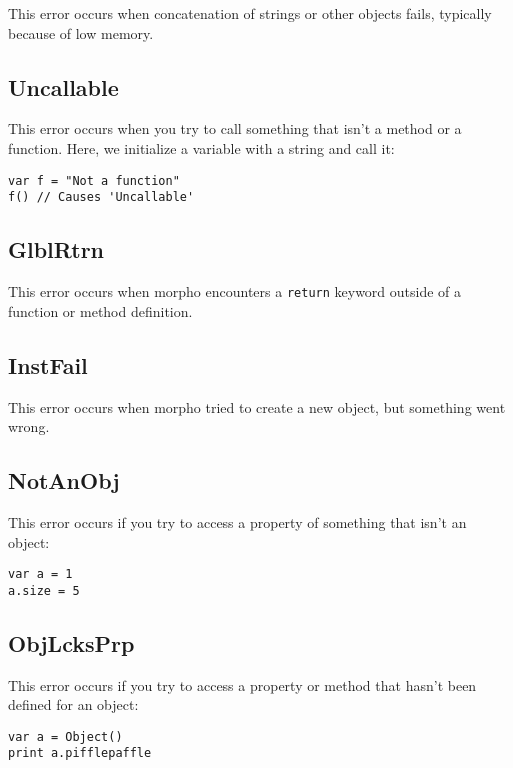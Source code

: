 This error occurs when concatenation of strings or other objects fails,
typically because of low memory.

\hypertarget{uncallable}{%
\subsection{Uncallable}\label{uncallable}}

This error occurs when you try to call something that isn't a method or
a function. Here, we initialize a variable with a string and call it:

\begin{lstlisting}
var f = "Not a function"
f() // Causes 'Uncallable'
\end{lstlisting}

\hypertarget{glblrtrn}{%
\subsection{GlblRtrn}\label{glblrtrn}}

This error occurs when morpho encounters a \texttt{return} keyword
outside of a function or method definition.

\hypertarget{instfail}{%
\subsection{InstFail}\label{instfail}}

This error occurs when morpho tried to create a new object, but
something went wrong.

\hypertarget{notanobj}{%
\subsection{NotAnObj}\label{notanobj}}

This error occurs if you try to access a property of something that
isn't an object:

\begin{lstlisting}
var a = 1
a.size = 5
\end{lstlisting}

\hypertarget{objlcksprp}{%
\subsection{ObjLcksPrp}\label{objlcksprp}}

This error occurs if you try to access a property or method that hasn't
been defined for an object:

\begin{lstlisting}
var a = Object()
print a.pifflepaffle
\end{lstlisting}

